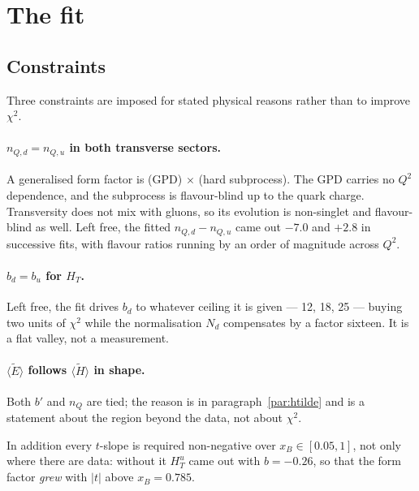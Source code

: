 \documentclass[11pt,a4paper]{article}
\begin{document}
\begin{table}[htb]
\centering\small
\caption{Fitted normalisations.}
\label{tab:norms}

\end{table}

\section{The fit}

\subsection{Constraints}

Three constraints are imposed for stated physical reasons rather than to improve
$\chi^2$.

\paragraph{$n_{Q,d} = n_{Q,u}$ in both transverse sectors.}  A generalised form
factor is (GPD) $\times$ (hard subprocess).  The GPD carries no $Q^2$
dependence, and the subprocess is flavour-blind up to the quark charge.
Transversity does not mix with gluons, so its evolution is non-singlet and
flavour-blind as well.  Left free, the fitted $n_{Q,d} - n_{Q,u}$ came out
$-7.0$ and $+2.8$ in successive fits, with flavour ratios running by an order
of magnitude across $Q^2$.

\paragraph{$b_d = b_u$ for $H_T$.}  Left free, the fit drives $b_d$ to whatever
ceiling it is given --- 12, 18, 25 --- buying two units of $\chi^2$ while the
normalisation $N_d$ compensates by a factor sixteen.  It is a flat valley, not
a measurement.

\paragraph{$\langle\tilde E\rangle$ follows $\langle\tilde H\rangle$ in shape.}
Both $b'$ and $n_Q$ are tied; the reason is in paragraph~\ref{par:htilde} and is
a statement about the region beyond the data, not about $\chi^2$.

In addition every $t$-slope is required non-negative over $x_B \in [0.05,1]$,
not only where there are data: without it $H_T^u$ came out with $b=-0.26$, so
that the form factor \emph{grew} with $|t|$ above $x_B = 0.785$.
\end{document}
